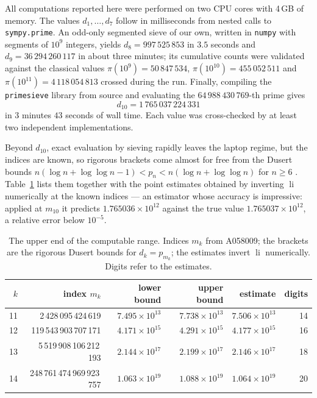 \documentclass[11pt,a4paper]{article}
\theoremstyle{plain}
\theoremstyle{definition}
\newcommand{\li}{\operatorname{li}}
\begin{document}
All computations reported here were performed on two CPU cores with 4\,GB
of memory. The values $d_1,\ldots,d_7$ follow in milliseconds from nested
calls to \texttt{sympy.prime}. An odd-only segmented sieve of our own,
written in \texttt{numpy} with segments of $10^9$ integers, yields
$d_8=997\,525\,853$ in $3.5$ seconds and
$d_9=36\,294\,260\,117$ in about three minutes; its cumulative counts were
validated against the classical values $\pi(10^9)=50\,847\,534$,
$\pi(10^{10})=455\,052\,511$ and $\pi(10^{11})=4\,118\,054\,813$ crossed
during the run. Finally, compiling the \texttt{primesieve} library
\cite{primesieve} from source and evaluating the
$64\,988\,430\,769$-th prime gives
\[
  d_{10}=1\,765\,037\,224\,331
\]
in $3$ minutes $43$ seconds of wall time. Each value was cross-checked by
at least two independent implementations.

Beyond $d_{10}$, exact evaluation by sieving rapidly leaves the laptop
regime, but the indices are known, so rigorous brackets come almost for
free from the Dusert bounds $n(\log n+\log\log n-1)<p_n<n(\log n+\log\log
n)$ for $n\ge6$ \cite{Dusert}. Table~\ref{tab:bounds} lists them together
with the point estimates obtained by inverting $\li$ numerically at the
known indices --- an estimator whose accuracy is impressive: applied at
$m_{10}$ it predicts $1.765036\times10^{12}$ against the true value
$1.765037\times10^{12}$, a relative error below $10^{-5}$.

\begin{table}[htbp]
\centering
\small
\caption{The upper end of the computable range. Indices $m_k$ from A058009;
the brackets are the rigorous Dusert bounds for $d_k=p_{m_k}$; the estimates
invert $\li$ numerically. Digits refer to the estimates.}
\label{tab:bounds}
\begin{tabular}{@{}rrrrrr@{}}
\toprule
$k$ & index $m_k$ & lower bound & upper bound & estimate & digits\\
\midrule
11 & 2\,428\,095\,424\,619 & $7.495\times10^{13}$ & $7.738\times10^{13}$
  & $7.506\times10^{13}$ & 14\\
12 & 119\,543\,903\,707\,171 & $4.171\times10^{15}$ & $4.291\times10^{15}$
  & $4.177\times10^{15}$ & 16\\
13 & 5\,519\,908\,106\,212\,193 & $2.144\times10^{17}$ & $2.199\times10^{17}$
  & $2.146\times10^{17}$ & 18\\
14 & 248\,761\,474\,969\,923\,757 & $1.063\times10^{19}$ & $1.088\times10^{19}$
  & $1.064\times10^{19}$ & 20\\
\bottomrule
\end{tabular}
\end{table}
\end{document}

